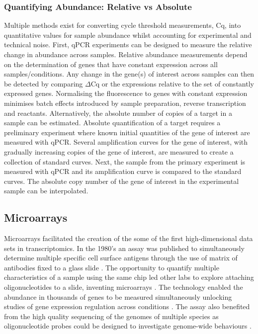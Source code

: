 \documentclass[../main.tex]{subfiles}
\begin{document}
\subsubsection{Quantifying Abundance: Relative vs Absolute}

Multiple methods exist for converting cycle threshold measurements, Cq, into quantitative values for sample abundance whilst accounting for experimental and technical noise.
First, qPCR experiments can be designed to measure the relative change in abundance across samples.
Relative abundance measurements depend on the determination of genes that have constant expression across all samples/conditions.
Any change in the gene(s) of interest across samples can then be detected by comparing $\Delta$Cq or the expressions relative to the set of constantly expressed genes.
Normalising the fluorescence to genes with constant expression minimises batch effects introduced by sample preparation, reverse transcription and reactants.
Alternatively, the absolute number of copies of a target in a sample can be estimated.
Absolute quantification of a target requires a preliminary experiment where known initial quantities of the gene of interest are measured with qPCR.
Several amplification curves for the gene of interest, with gradually increasing copies of the gene of interest, are measured to create a collection of standard curves.
Next, the sample from the primary experiment is measured with qPCR and its amplification curve is compared to the standard curves.
The absolute copy number of the gene of interest in the experimental sample can be interpolated.

\subsection{Microarrays}

Microarrays facilitated the creation of the some of the first high-dimensional data sets in transcriptomics.
In the 1980's an assay was published to simultaneously determine multiple specific cell surface antigens through the use of matrix of antibodies fixed to a glass slide \parencite{TseWen1983}.
The opportunity to quantify multiple characteristics of a sample using the same chip led other labs to explore attaching oligonucleotides to a slide, inventing microarrays \parencite{Schena1995}.
The technology enabled the abundance in thousands of genes to be measured simultaneously unlocking studies of gene expression regulation across conditions \parencite{Gasch2000}. 
The assay also benefited from the high quality sequencing of the genomes of multiple species as oligonucleotide probes could be designed to investigate genome-wide behaviours \parencite{Lander2001}.
\end{document}
